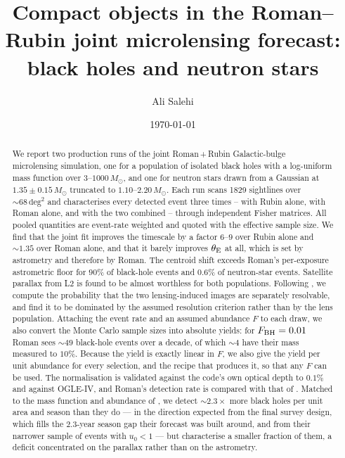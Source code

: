 \documentclass[english,10pt,a4paper]{article}
\title{Compact objects in the Roman--Rubin joint microlensing forecast:\\
       black holes and neutron stars}
\author{Ali Salehi}
\date{\today}
\newcommand{\tetE}{\theta_{\rm E}}
\newcommand{\Msun}{M_\odot}
\begin{document}
\maketitle

\begin{abstract}
We report two production runs of the joint Roman\,+\,Rubin Galactic-bulge microlensing
simulation, one for a population of isolated black holes with a log-uniform mass function over
$3$--$1000\,\Msun$, and one for neutron stars drawn from a Gaussian at $1.35\pm0.15\,\Msun$
truncated to $1.10$--$2.20\,\Msun$. Each run scans 1829 sightlines over $\sim\!68\,\mathrm{deg}^2$
and characterises every detected event three times -- with Rubin alone, with Roman alone, and
with the two combined -- through independent Fisher matrices. All pooled quantities are
event-rate weighted and quoted with the \citet{Kish1965} effective sample size. We find that the joint fit
improves the timescale by a factor $6$--$9$ over Rubin alone and $\sim\!1.35$ over Roman
alone, and that it barely improves $\tetE$ at all, which is set by astrometry and therefore by
Roman. The centroid shift exceeds Roman's per-exposure astrometric floor for $90\%$ of
black-hole events and $0.6\%$ of neutron-star events. Satellite parallax from L2 is found to be
almost worthless for both populations. Following \citet{SajadianMakler2026}, we compute the
probability that the two lensing-induced images are separately resolvable, and find it to be
dominated by the assumed resolution criterion rather than by the lens population. Attaching the
event rate and an assumed abundance $F$ to each draw, we also convert the Monte Carlo sample sizes
into absolute yields: for $F_{\rm BH}=0.01$ Roman sees $\sim\!49$ black-hole events over a decade,
of which $\sim\!4$ have their mass measured to $10\%$. Because the yield is exactly linear in $F$, we also give the yield per unit
abundance for every selection, and the recipe that produces it, so that any $F$ can be used. The normalisation is validated against the
code's own optical depth to $0.1\%$ and against OGLE-IV, and Roman's detection rate is compared with
that of \citet{Penny2019}. Matched to
the mass function and abundance of \citet{SajadianSahu2023}, we detect $\sim\!2.3\times$ more
black holes per unit area and season than they do --- in the direction expected from the final
survey design, which fills the $2.3$-year season gap their forecast was built around, and from
their narrower sample of events with $u_0<1$ --- but characterise a smaller
fraction of them, a deficit concentrated on the parallax rather than on the astrometry.
\end{abstract}
\end{document}
